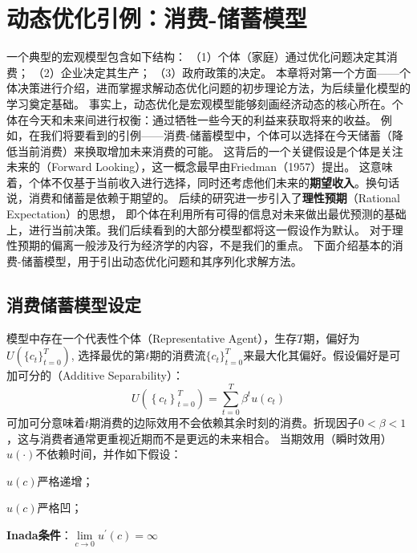 
\section{动态优化引例：消费-储蓄模型} \label{sec-consumption-saving}

一个典型的宏观模型包含如下结构：
（1）个体（家庭）通过优化问题决定其消费；
（2）企业决定其生产；
（3）政府政策的决定。
本章将对第一个方面——个体决策进行介绍，进而掌握求解动态优化问题的初步理论方法，为后续量化模型的学习奠定基础。
事实上，动态优化是宏观模型能够刻画经济动态的核心所在。个体在今天和未来间进行权衡：通过牺牲一些今天的利益来获取将来的收益。
例如，在我们将要看到的引例——消费-储蓄模型中，个体可以选择在今天储蓄（降低当前消费）来换取增加未来消费的可能。
这背后的一个关键假设是个体是关注未来的（Forward Looking），这一概念最早由Friedman（1957）提出。
这意味着，个体不仅基于当前收入进行选择，同时还考虑他们未来的\textbf{期望收入}。换句话说，消费和储蓄是依赖于期望的。
后续的研究进一步引入了\textbf{理性预期}（Rational Expectation）的思想，
即个体在利用所有可得的信息对未来做出最优预测的基础上，进行当前决策。我们后续看到的大部分模型都将这一假设作为默认。
对于理性预期的偏离一般涉及行为经济学的内容，不是我们的重点。
下面介绍基本的消费-储蓄模型，用于引出动态优化问题和其序列化求解方法。


\subsection{消费储蓄模型设定}

模型中存在一个代表性个体（Representative Agent），生存$T$期，偏好为$U\left(\{c_t\}_{t=0}^T\right)$,
选择最优的第$t$期的消费流$\{c_t\}_{t=0}^T$来最大化其偏好。假设偏好是可加可分的（Additive Separability）：
\begin{equation*}
    U\left(\left\{c_t\right\}_{t=0}^T\right)=\sum_{t=0}^T \beta^t u\left(c_t\right)
\end{equation*}
可加可分意味着$t$期消费的边际效用不会依赖其余时刻的消费。折现因子$0<\beta<1$，这与消费者通常更重视近期而不是更远的未来相合。
当期效用（瞬时效用）$u(\cdot)$不依赖时间，并作如下假设：
\begin{assumption}
    $u(c)$严格递增；
\end{assumption}
\begin{assumption}
    $u(c)$严格凹；
\end{assumption}
\begin{assumption}
    \textbf{Inada条件}：$\lim\limits_{c\rightarrow 0}u^{\prime}(c) = \infty$
\end{assumption}

